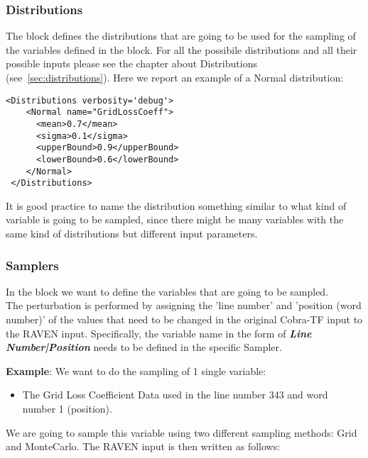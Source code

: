 \subsubsection{Distributions}
The  block defines the distributions that are going
to be used for the sampling of the variables defined in the  block.
%
For all the possibile distributions and all their possible inputs please see the
chapter about Distributions (see~\ref{sec:distributions}).
%
Here we report an example of a Normal distribution:
\begin{lstlisting}[style=XML,morekeywords={name,debug}]
<Distributions verbosity='debug'>
    <Normal name="GridLossCoeff">
      <mean>0.7</mean>
      <sigma>0.1</sigma>
      <upperBound>0.9</upperBound>
      <lowerBound>0.6</lowerBound>
    </Normal>
 </Distributions>
\end{lstlisting}

It is good practice to name the distribution something similar to what kind of
variable is going to be sampled, since there might be many variables with the
same kind of distributions but different input parameters.

\subsubsection{Samplers}
In the  block we want to define the variables that are going to be sampled.
%
\\The perturbation is performed by assigning the 'line number' and 'position (word number)' of the values that need to be changed in the original Cobra-TF input to the RAVEN input. 
Specifically, the variable name in the form of \textbf{\textit{Line Number|Position}} needs to be defined in the specific Sampler.

\textbf{Example}:
We want to do the sampling of 1 single variable:
\begin{itemize}
  \item The Grid Loss Coefficient Data used in the line number 343 and word number 1 (position).
\end{itemize}

We are going to sample this variable using two different sampling methods: Grid and MonteCarlo.
The RAVEN input is then written as follows:

